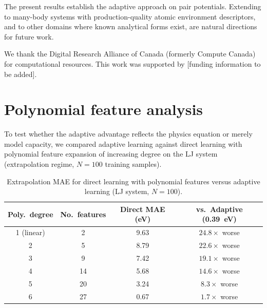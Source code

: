 \documentclass[aps,prb,twocolumn,superscriptaddress,longbibliography,floatfix]{revtex4-2}
\begin{document}
The present results establish the adaptive approach on pair potentials. Extending to many-body systems with production-quality atomic environment descriptors, and to other domains where known analytical forms exist, are natural directions for future work.


\begin{acknowledgments}
We thank the Digital Research Alliance of Canada (formerly Compute Canada) for computational resources. This work was supported by [funding information to be added].
\end{acknowledgments}




\clearpage
\onecolumngrid
\appendix

\section{Polynomial feature analysis}
\label{app:polynomial}

To test whether the adaptive advantage reflects the physics equation or merely model capacity, we compared adaptive learning against direct learning with polynomial feature expansion of increasing degree on the LJ system (extrapolation regime, $N = 100$ training samples).

\begin{table}[h]
  \caption{Extrapolation MAE for direct learning with polynomial features versus adaptive learning (LJ system, $N = 100$).}
  \label{tab:polynomial}
  \begin{ruledtabular}
  \begin{tabular}{cccc}
    Poly.\ degree & No.\ features & Direct MAE (eV) & vs.\ Adaptive (0.39~eV) \\
    \hline
    1 (linear) & 2 & 9.63 & $24.8\times$ worse \\
    2 & 5 & 8.79 & $22.6\times$ worse \\
    3 & 9 & 7.42 & $19.1\times$ worse \\
    4 & 14 & 5.68 & $14.6\times$ worse \\
    5 & 20 & 3.24 & $8.3\times$ worse \\
    6 & 27 & 0.67 & $1.7\times$ worse \\
  \end{tabular}
  \end{ruledtabular}
\end{table}
\end{document}
